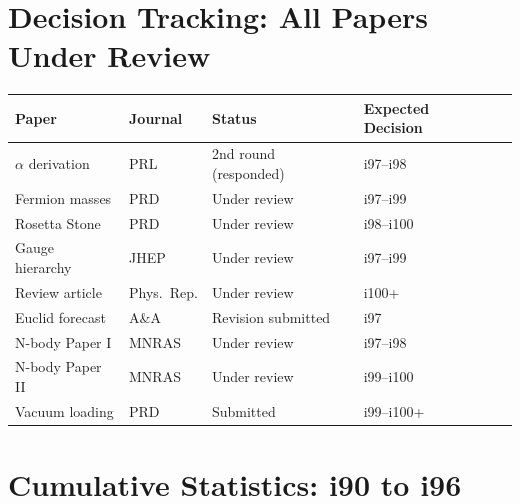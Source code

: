\documentclass[11pt,a4paper]{article}
\begin{document}
\section{Decision Tracking: All Papers Under Review}

\begin{center}
\begin{tabular}{lllll}
\toprule
\textbf{Paper} & \textbf{Journal} & \textbf{Status} & \textbf{Expected Decision} \\
\midrule
$\alpha$ derivation & PRL & 2nd round (responded) & i97--i98 \\
Fermion masses & PRD & Under review & i97--i99 \\
Rosetta Stone & PRD & Under review & i98--i100 \\
Gauge hierarchy & JHEP & Under review & i97--i99 \\
Review article & Phys.\ Rep. & Under review & i100+ \\
Euclid forecast & A\&A & Revision submitted & i97 \\
N-body Paper I & MNRAS & Under review & i97--i98 \\
N-body Paper II & MNRAS & Under review & i99--i100 \\
Vacuum loading & PRD & Submitted & i99--i100+ \\
\bottomrule
\end{tabular}
\end{center}

\section{Cumulative Statistics: i90 to i96}
\end{document}
